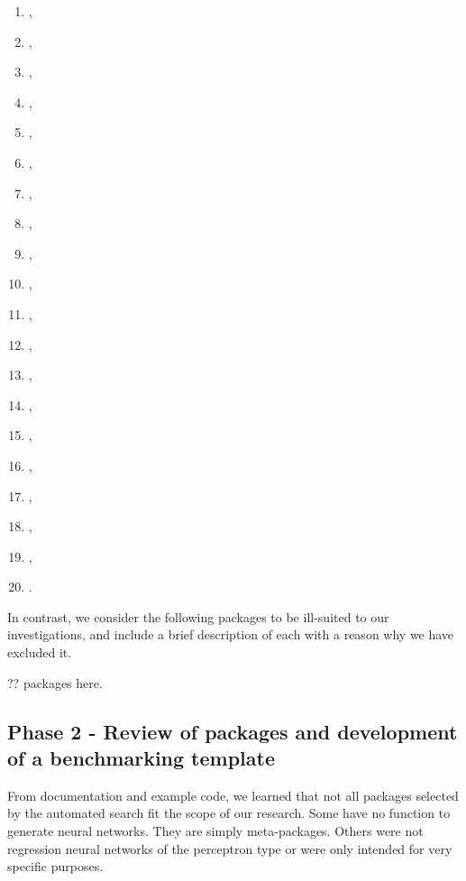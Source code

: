 \begin{enumerate}
\item
   \citep{R-rasclass},
\item
   \citep{R-rcane},
\item
   \citep{R-regressoR},
\item
   \citep{R-rminer},
\item
   \citep{R-rnn},
\item
   \citep{R-RSNNS},
\item
   \citep{R-ruta},
\item
   \citep{R-simpleNeural},
\item
   \citep{R-snnR},
\item
   \citep{R-softmaxreg},
\item
   \citep{R-Sojourn.Data},
\item
   \citep{R-spnn},
\item
   \citep{R-TeachNet},
\item
   \citep{R-tensorflow},
\item
   \citep{R-tfestimators},
\item
   \citep{R-trackdem},
\item
   \citep{R-TrafficBDE},
\item
   \citep{R-tsensembler},
\item
   \citep{R-validann},
\item
   \citep{R-zFactor}.
\end{enumerate}

In contrast, we consider the following packages to be ill-suited to our
investigations, and include a brief description of each with a reason
why we have excluded it.

?? packages here.

\hypertarget{phase-2---review-of-packages-and-development-of-a-benchmarking-template}{%
\subsection{Phase 2 - Review of packages and development of a
benchmarking
template}\label{phase-2---review-of-packages-and-development-of-a-benchmarking-template}}

From documentation and example code, we learned that not all packages
selected by the automated search fit the scope of our research. Some
have no function to generate neural networks. They are simply
meta-packages. Others were not regression neural networks of the
perceptron type or were only intended for very specific purposes.

